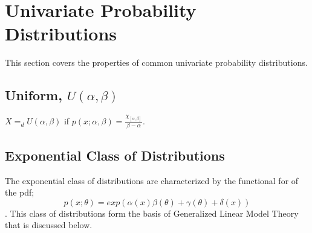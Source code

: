 %
%
%


\section{Univariate Probability Distributions}
This section covers the properties of common univariate
probability distributions.

\subsection{Uniform,  $U(\alpha,\beta)$}
$X=_d U(\alpha,\beta)$ if $p(x; \alpha, \beta)=
\frac{\chi_{[\alpha,\beta]}}{\beta-\alpha}.$

\subsection{Exponential Class of Distributions}
The exponential class of distributions are characterized by the
functional for of the pdf; \[ p(x;\theta) =
exp(\alpha(x)\beta(\theta)+\gamma(\theta)+\delta(x) ) \].  This
class of distributions form the basis of Generalized Linear
Model Theory that is discussed below.

